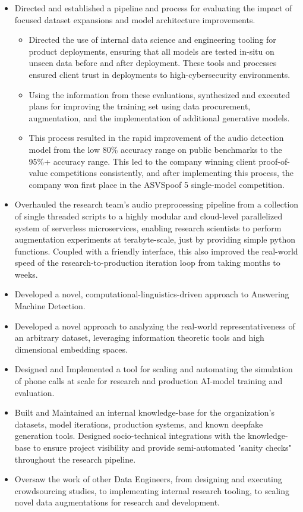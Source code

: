 \documentclass[10pt,a4paper,sans]{moderncv}
\begin{document}
{\begin{itemize}
\begin{itemize}
    \end{itemize}
  \item Directed and established a pipeline and process for evaluating the impact of focused dataset expansions and model architecture improvements.
    \begin{itemize}
      \item Directed the use of internal data science and engineering tooling for product deployments, ensuring that all models are tested in-situ on unseen data before and after deployment. These tools and processes ensured client trust in deployments to high-cybersecurity environments.
      \item Using the information from these evaluations, synthesized and executed plans for improving the training set using data procurement, augmentation, and the implementation of additional generative models.
      \item This process resulted in the rapid improvement of the audio detection model from the low 80\% accuracy range on public benchmarks to the 95\%+ accuracy range. This led to the company winning client proof-of-value competitions consistently, and after implementing this process, the company won first place in the ASVSpoof 5 single-model competition.
    \end{itemize}
  \item Overhauled the research team's audio preprocessing pipeline from a collection of single threaded scripts to a highly modular and cloud-level parallelized system of serverless microservices, enabling research scientists to perform augmentation experiments at terabyte-scale, just by providing simple python functions. Coupled with a friendly interface, this also improved the real-world speed of the research-to-production iteration loop from taking months to weeks.
  \item Developed a novel, computational-linguistics-driven approach to Answering Machine Detection.
  \item Developed a novel approach to analyzing the real-world representativeness of an arbitrary dataset, leveraging information theoretic tools and high dimensional embedding spaces.
  \item Designed and Implemented a tool for scaling and automating the simulation of phone calls at scale for research and production AI-model training and evaluation.
  \item Built and Maintained an internal knowledge-base for the organization's datasets, model iterations, production systems, and known deepfake generation tools. Designed socio-technical integrations with the knowledge-base to ensure project visibility and provide semi-automated "sanity checks" throughout the research pipeline.
  \item Oversaw the work of other Data Engineers, from designing and executing crowdsourcing studies, to implementing internal research tooling, to scaling novel data augmentations for research and development.
\end{itemize}}
\end{document}
